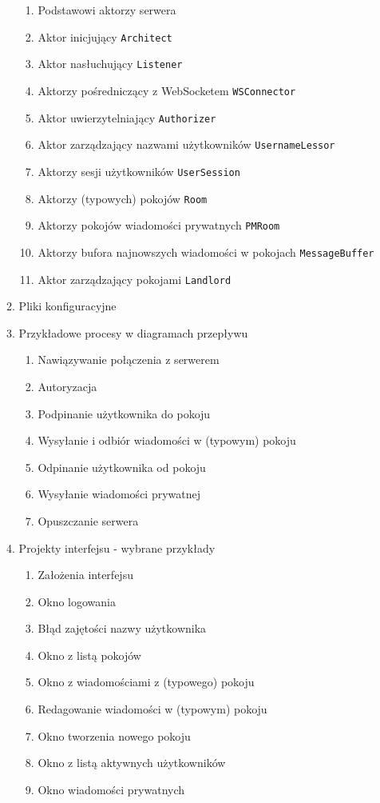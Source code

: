 \documentclass[11pt,oneside,a4paper,twocolumn]{article}
\begin{document}
\begin{enumerate}
\begin{enumerate}
\begin{enumerate}
		\item Podstawowi aktorzy serwera
		\item Aktor inicjujący \texttt{Architect}
		\item Aktor nasłuchujący \texttt{Listener}
		\item Aktorzy pośredniczący z WebSocketem \texttt{WSConnector}
		\item Aktor uwierzytelniający \texttt{Authorizer}
		\item Aktor zarządzający nazwami użytkowników \texttt{UsernameLessor}
		\item Aktorzy sesji użytkowników \texttt{UserSession}
		\item Aktorzy (typowych) pokojów \texttt{Room}
		\item Aktorzy pokojów wiadomości prywatnych \texttt{PMRoom}
		\item Aktorzy bufora najnowszych wiadomości w pokojach \texttt{MessageBuffer}
		\item Aktor zarządzający pokojami \texttt{Landlord}
	\end{enumerate}
	\item Pliki konfiguracyjne
	\item Przykładowe procesy w diagramach przepływu
	\begin{enumerate}
		\item Nawiązywanie połączenia z serwerem
		\item Autoryzacja
		\item Podpinanie użytkownika do pokoju
		\item Wysyłanie i odbiór wiadomości w (typowym) pokoju
		\item Odpinanie użytkownika od pokoju
		\item Wysyłanie wiadomości prywatnej
		\item Opuszczanie serwera
	\end{enumerate}
	
	\item Projekty interfejsu - wybrane przykłady
	\begin{enumerate}
		\item Założenia interfejsu
		\item Okno logowania
		\item Błąd zajętości nazwy użytkownika
		\item Okno z listą pokojów
		\item Okno z wiadomościami z (typowego) pokoju
		\item Redagowanie wiadomości w (typowym) pokoju
		\item Okno tworzenia nowego pokoju		
		\item Okno z listą aktywnych użytkowników
		\item Okno wiadomości prywatnych
	\end{enumerate}
\end{enumerate}

\end{enumerate}
\end{document}
